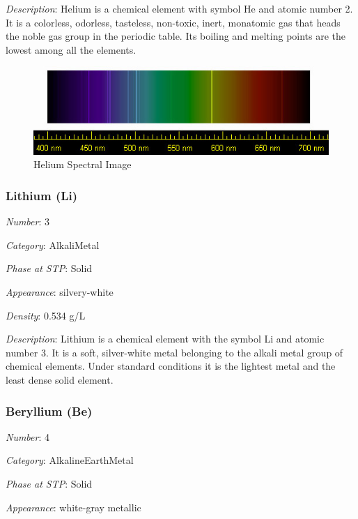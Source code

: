 \documentclass{article}
\begin{document}
\textit{Description}: Helium is a chemical element with symbol He and atomic number 2. It is a colorless, odorless, tasteless, non-toxic, inert, monatomic gas that heads the noble gas group in the periodic table. Its boiling and melting points are the lowest among all the elements.

\immediate{}
\begin{figure}[!ht]
    \centering
    \includegraphics[width=12cm]{./resources/spectral_img/Helium_spectrum.jpg}
    \caption{Helium Spectral Image}
\end{figure}

\hypertarget{subsubsection::Li}{}\subsubsection{Lithium (Li)}

\textit{Number}: 3

\textit{Category}: AlkaliMetal

\textit{Phase at STP}: Solid

\textit{Appearance}: silvery-white

\textit{Density}: 0.534 g/L

\textit{Description}: Lithium is a chemical element with the symbol Li and atomic number 3. It is a soft, silver-white metal belonging to the alkali metal group of chemical elements. Under standard conditions it is the lightest metal and the least dense solid element.

\hypertarget{subsubsection::Be}{}\subsubsection{Beryllium (Be)}

\textit{Number}: 4

\textit{Category}: AlkalineEarthMetal

\textit{Phase at STP}: Solid

\textit{Appearance}: white-gray metallic
\end{document}
